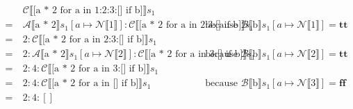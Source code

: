 \documentclass[12pt]{article}
\newcommand{\dblbr}[1]{\llbracket#1\rrbracket}
\newcommand{\fancybr}[2]{#1 \dblbr{#2}}
\renewcommand{\AA}{\mathcal{A}}
\newcommand{\BB}{\mathcal{B}}
\newcommand{\CC}{\mathcal{C}}
\newcommand{\NN}{\mathcal{N}}
\begin{document}
$\begin{aligned}
    & \fancybr{\CC}{\text{[a * 2 for a in 1:2:3:[] if b]}} s_1\\
    =\ & \fancybr{\AA}{\text{a * 2}} s_1[a \mapsto \fancybr{\NN}{1}] : \fancybr{\CC}{\text{[a * 2 for a in 2:3:[] if b]}} s_1
    & \text{because } \fancybr{\BB}{\text{b}} s_1[a \mapsto \fancybr{\NN}{1}] = \mathbf{tt}\\
    =\ & 2 : \fancybr{\CC}{\text{[a * 2 for a in 2:3:[] if b]}} s_1\\
    =\ & 2 : \fancybr{\AA}{\text{a * 2}} s_1[a \mapsto \fancybr{\NN}{2}] : \fancybr{\CC}{\text{[a * 2 for a in 3:[] if b]}} s_1
    & \text{because } \fancybr{\BB}{\text{b}} s_1[a \mapsto \fancybr{\NN}{2}] = \mathbf{tt}\\
    =\ & 2 : 4 : \fancybr{\CC}{\text{[a * 2 for a in 3:[] if b]}} s_1\\
    =\ & 2 : 4 : \fancybr{\CC}{\text{[a * 2 for a in [] if b]}} s_1
    & \text{because } \fancybr{\BB}{\text{b}} s_1[a \mapsto \fancybr{\NN}{3}] = \mathbf{ff}\\
    =\ & 2 : 4 : []\\
\end{aligned}$

\printbibliography
\end{document}
